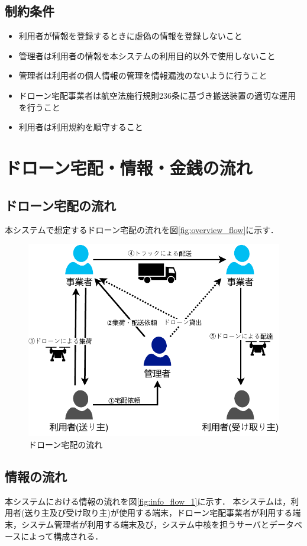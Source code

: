 \documentclass[a4paper, titlepage]{jsarticle}
\begin{document}
\subsection{制約条件}
\begin{itemize}
        \item 利用者が情報を登録するときに虚偽の情報を登録しないこと
        \item 管理者は利用者の情報を本システムの利用目的以外で使用しないこと
        \item 管理者は利用者の個人情報の管理を情報漏洩のないように行うこと
        \item ドローン宅配事業者は航空法施行規則236条に基づき搬送装置の適切な運用を行うこと
        \item 利用者は利用規約を順守すること
\end{itemize}
\section{ドローン宅配・情報・金銭の流れ}

\subsection{ドローン宅配の流れ}
本システムで想定するドローン宅配の流れを図\ref{fig:overview_flow}に示す．

\begin{figure}[H]
  \centering
  \includegraphics[width=0.6\linewidth]{./overview_flow.pdf}
  \caption{ドローン宅配の流れ}
  \label{fig:overview_flow_1}
\end{figure}

\subsection{情報の流れ}
本システムにおける情報の流れを図\ref{fig:info_flow_1}に示す．
本システムは，利用者(送り主及び受け取り主)が使用する端末，ドローン宅配事業者が利用する端末，システム管理者が利用する端末及び，システム中核を担うサーバとデータベースによって構成される．
\end{document}
